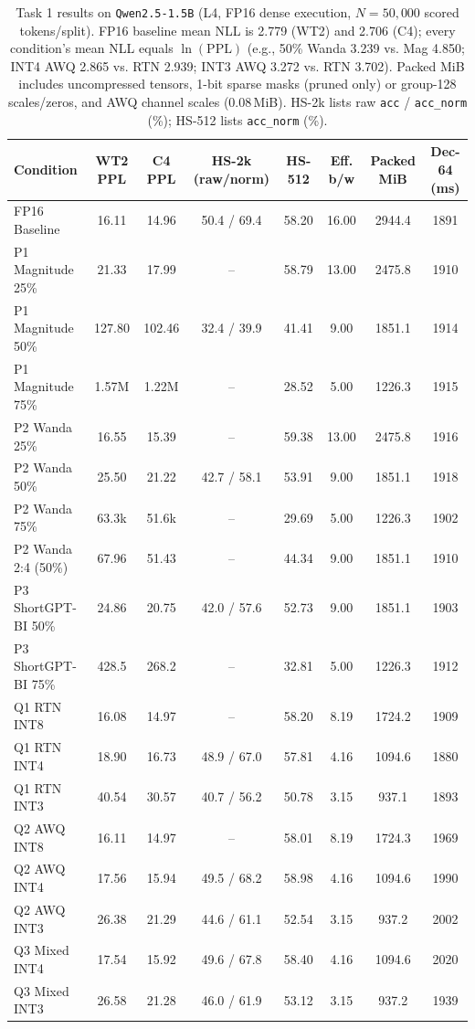 \documentclass{article}
\begin{document}
\begin{table}[t]
\centering\footnotesize
\caption{Task 1 results on \texttt{Qwen2.5-1.5B} (L4, FP16 dense execution, $N=50{,}000$ scored tokens/split). FP16 baseline mean NLL is 2.779 (WT2) and 2.706 (C4); every condition's mean NLL equals $\ln(\text{PPL})$ (e.g., 50\% Wanda 3.239 vs. Mag 4.850; INT4 AWQ 2.865 vs. RTN 2.939; INT3 AWQ 3.272 vs. RTN 3.702). Packed MiB includes uncompressed tensors, 1-bit sparse masks (pruned only) or group-128 scales/zeros, and AWQ channel scales (0.08\,MiB). HS-2k lists raw \texttt{acc} / \texttt{acc\_norm} (\%); HS-512 lists \texttt{acc\_norm} (\%).}
\label{tab:t1}
\begin{tabular}{lccccccc}
\toprule
Condition & WT2 PPL & C4 PPL & HS-2k (raw/norm) & HS-512 & Eff. b/w & Packed MiB & Dec-64 (ms) \\
\midrule
FP16 Baseline & 16.11 & 14.96 & 50.4 / 69.4 & 58.20 & 16.00 & 2944.4 & 1891 \\
\midrule
P1 Magnitude 25\% & 21.33 & 17.99 & -- & 58.79 & 13.00 & 2475.8 & 1910 \\
P1 Magnitude 50\% & 127.80 & 102.46 & 32.4 / 39.9 & 41.41 & 9.00 & 1851.1 & 1914 \\
P1 Magnitude 75\% & 1.57M & 1.22M & -- & 28.52 & 5.00 & 1226.3 & 1915 \\
P2 Wanda 25\% & 16.55 & 15.39 & -- & 59.38 & 13.00 & 2475.8 & 1916 \\
P2 Wanda 50\% & 25.50 & 21.22 & 42.7 / 58.1 & 53.91 & 9.00 & 1851.1 & 1918 \\
P2 Wanda 75\% & 63.3k & 51.6k & -- & 29.69 & 5.00 & 1226.3 & 1902 \\
P2 Wanda 2:4 (50\%) & 67.96 & 51.43 & -- & 44.34 & 9.00 & 1851.1 & 1910 \\
P3 ShortGPT-BI 50\% & 24.86 & 20.75 & 42.0 / 57.6 & 52.73 & 9.00 & 1851.1 & 1903 \\
P3 ShortGPT-BI 75\% & 428.5 & 268.2 & -- & 32.81 & 5.00 & 1226.3 & 1912 \\
\midrule
Q1 RTN INT8 & 16.08 & 14.97 & -- & 58.20 & 8.19 & 1724.2 & 1909 \\
Q1 RTN INT4 & 18.90 & 16.73 & 48.9 / 67.0 & 57.81 & 4.16 & 1094.6 & 1880 \\
Q1 RTN INT3 & 40.54 & 30.57 & 40.7 / 56.2 & 50.78 & 3.15 & 937.1 & 1893 \\
Q2 AWQ INT8 & 16.11 & 14.97 & -- & 58.01 & 8.19 & 1724.3 & 1969 \\
Q2 AWQ INT4 & 17.56 & 15.94 & 49.5 / 68.2 & 58.98 & 4.16 & 1094.6 & 1990 \\
Q2 AWQ INT3 & 26.38 & 21.29 & 44.6 / 61.1 & 52.54 & 3.15 & 937.2 & 2002 \\
Q3 Mixed INT4 & 17.54 & 15.92 & 49.6 / 67.8 & 58.40 & 4.16 & 1094.6 & 2020 \\
Q3 Mixed INT3 & 26.58 & 21.28 & 46.0 / 61.9 & 53.12 & 3.15 & 937.2 & 1939 \\
\bottomrule
\end{tabular}
\end{table}
\end{document}
